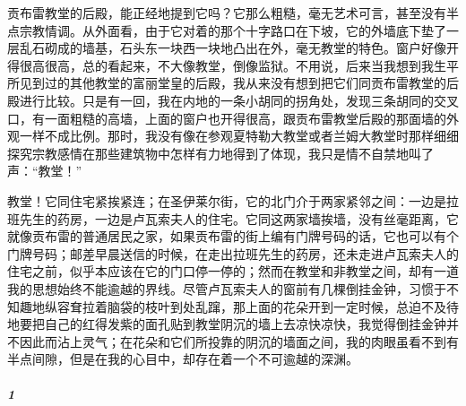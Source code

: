 \par 贡布雷教堂的后殿，能正经地提到它吗？它那么粗糙，毫无艺术可言，甚至没有半点宗教情调。从外面看，由于它对着的那个十字路口在下坡，它的外墙底下垫了一层乱石砌成的墙基，石头东一块西一块地凸出在外，毫无教堂的特色。窗户好像开得很高很高，总的看起来，不大像教堂，倒像监狱。不用说，后来当我想到我生平所见到过的其他教堂的富丽堂皇的后殿，我从来没有想到把它们同贡布雷教堂的后殿进行比较。只是有一回，我在内地的一条小胡同的拐角处，发现三条胡同的交叉口，有一面粗糙的高墙，上面的窗户也开得很高，跟贡布雷教堂后殿的那面墙的外观一样不成比例。那时，我没有像在参观夏特勒大教堂或者兰姆大教堂时那样细细探究宗教感情在那些建筑物中怎样有力地得到了体现，我只是情不自禁地叫了声：“教堂！”
\par 教堂！它同住宅紧挨紧连；在圣伊莱尔街，它的北门介于两家紧邻之间：一边是拉班先生的药房，一边是卢瓦索夫人的住宅。它同这两家墙挨墙，没有丝毫距离，它就像贡布雷的普通居民之家，如果贡布雷的街上编有门牌号码的话，它也可以有个门牌号码；邮差早晨送信的时候，在走出拉班先生的药房，还未走进卢瓦索夫人的住宅之前，似乎本应该在它的门口停一停的；然而在教堂和非教堂之间，却有一道我的思想始终不能逾越的界线。尽管卢瓦索夫人的窗前有几棵倒挂金钟，习惯于不知趣地纵容耷拉着脑袋的枝叶到处乱蹿，那上面的花朵开到一定时候，总迫不及待地要把自己的红得发紫的面孔贴到教堂阴沉的墙上去凉快凉快，我觉得倒挂金钟并不因此而沾上灵气；在花朵和它们所投靠的阴沉的墙面之间，我的肉眼虽看不到有半点间隙，但是在我的心目中，却存在着一个不可逾越的深渊。


\subparagraph*{1}



